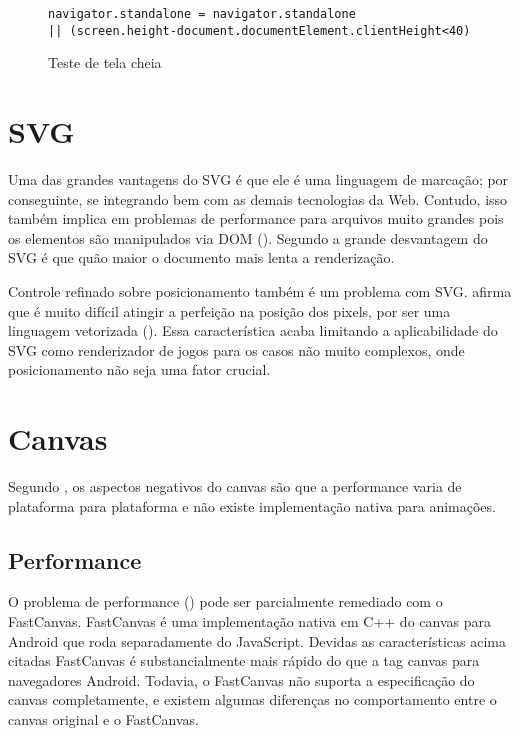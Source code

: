 \begin{figure}[H]
\centering
\begin{verbatim}
navigator.standalone = navigator.standalone 
|| (screen.height-document.documentElement.clientHeight<40)
\end{verbatim}
\caption{Teste de tela cheia}
\label{fig:fixJSTypes}
\end{figure}

\section{SVG}

Uma das grandes vantagens do SVG é que ele é uma linguagem de
marcação; por conseguinte, se integrando bem com as demais tecnologias
da Web. Contudo, isso também implica em problemas de performance para
arquivos muito grandes pois os elementos são manipulados via DOM
(). Segundo \citet{html5mostwanted} a
grande desvantagem do SVG é que quão maior o documento mais lenta a
renderização.

Controle refinado sobre posicionamento também é um problema com SVG.
\citet{html5mostwanted} afirma que é muito difícil atingir a
perfeição na posição dos pixels, por ser uma linguagem vetorizada
(). Essa característica acaba limitando
a aplicabilidade do SVG como renderizador de jogos para os casos não
muito complexos, onde posicionamento não seja uma fator crucial.

\section{Canvas}

Segundo \autocite{html5mostwanted}, os aspectos negativos do canvas são
que a performance varia de plataforma para plataforma e não existe
implementação nativa para animações.

\subsection{Performance}

O problema de performance () pode
ser parcialmente remediado com o FastCanvas. FastCanvas é uma
implementação nativa em C++ do canvas para Android que roda
separadamente do JavaScript. Devidas as características acima citadas
FastCanvas é substancialmente mais rápido do que a tag canvas para
navegadores Android. Todavia, o FastCanvas não suporta a
especificação do canvas completamente, e existem algumas diferenças no
comportamento entre o canvas original e o FastCanvas.

